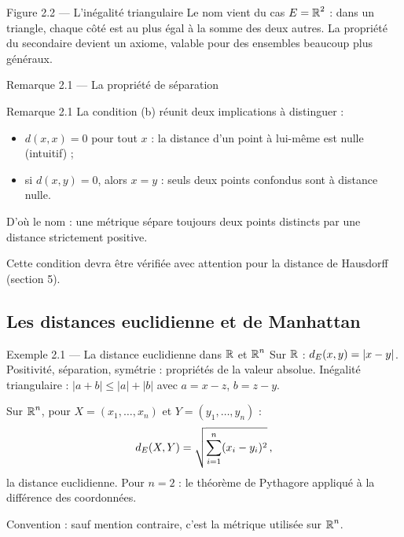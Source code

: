 \begin{frame}{Figure 2.2 --- L'inégalité triangulaire}
  \small Le nom vient du cas $E=\operatorname{\mathbb{R}}^2$ : dans un triangle, chaque côté est
  au plus égal à la somme des deux autres. La propriété du secondaire
  devient un axiome, valable pour des ensembles beaucoup plus
  généraux.
\end{frame}

\begin{frame}{Remarque 2.1 --- La propriété de séparation}
  \begin{Rem}{Remarque 2.1}
    La condition (b) réunit deux implications à distinguer :
    \begin{itemize}
      \item $d(x,x)=0$ pour tout $x$ : la distance d'un point à
        lui-même est nulle (intuitif) ;
      \item si $d(x,y)=0$, alors $x=y$ : seuls deux points
        confondus sont à distance nulle.
    \end{itemize}
    D'où le nom : une métrique sépare toujours deux points
    distincts par une distance strictement positive.
  \end{Rem}
  \vspace{6pt}
  \small Cette condition devra être vérifiée avec attention pour la
  distance de Hausdorff (section 5).
\end{frame}

\subsection{Les distances euclidienne et de Manhattan}

\begin{frame}{Exemple 2.1 --- La distance euclidienne dans $\operatorname{\mathbb{R}}$ et $\operatorname{\mathbb{R}}^n$}
  \small
  Sur $\operatorname{\mathbb{R}}$ : $d_E(x,y) = |x-y|$. Positivité, séparation, symétrie :
  propriétés de la valeur absolue. Inégalité triangulaire :
  $|a+b|\leq|a|+|b|$ avec $a=x-z$, $b=z-y$.

  \vspace{6pt}
  Sur $\operatorname{\mathbb{R}}^n$, pour $X=(x_1,\dots,x_n)$ et $Y=(y_1,\dots,y_n)$ :
  \[
    d_E(X,Y) = \sqrt{\sum_{i=1}^{n}(x_i-y_i)^2}\,,
  \]
  la distance euclidienne. Pour $n=2$ : le théorème de Pythagore
  appliqué à la différence des coordonnées.

  \vspace{6pt}
  Convention : sauf mention contraire, c'est la métrique
  utilisée sur $\operatorname{\mathbb{R}}^n$.
\end{frame}

